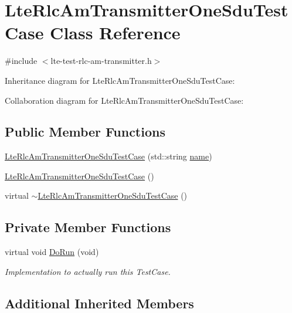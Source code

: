 \hypertarget{classLteRlcAmTransmitterOneSduTestCase}{}\section{Lte\+Rlc\+Am\+Transmitter\+One\+Sdu\+Test\+Case Class Reference}
\label{classLteRlcAmTransmitterOneSduTestCase}


{\ttfamily \#include $<$lte-\/test-\/rlc-\/am-\/transmitter.\+h$>$}



Inheritance diagram for Lte\+Rlc\+Am\+Transmitter\+One\+Sdu\+Test\+Case\+:


Collaboration diagram for Lte\+Rlc\+Am\+Transmitter\+One\+Sdu\+Test\+Case\+:
\subsection*{Public Member Functions}
\begin{DoxyCompactItemize}
\item 
\hyperlink{classLteRlcAmTransmitterOneSduTestCase_a5a7ff01bd5d69406feeff0df0a5ec461}{Lte\+Rlc\+Am\+Transmitter\+One\+Sdu\+Test\+Case} (std\+::string \hyperlink{generate__test__data__lte__spectrum__model_8m_ab74e6bf80237ddc4109968cedc58c151}{name})
\item 
\hyperlink{classLteRlcAmTransmitterOneSduTestCase_a667534b7b3e90d16e413663dfecf4d97}{Lte\+Rlc\+Am\+Transmitter\+One\+Sdu\+Test\+Case} ()
\item 
virtual \hyperlink{classLteRlcAmTransmitterOneSduTestCase_aacd1dfc48bf02744312df09ec14abaf5}{$\sim$\+Lte\+Rlc\+Am\+Transmitter\+One\+Sdu\+Test\+Case} ()
\end{DoxyCompactItemize}
\subsection*{Private Member Functions}
\begin{DoxyCompactItemize}
\item 
virtual void \hyperlink{classLteRlcAmTransmitterOneSduTestCase_ad0363c6b1e92694b98291cbca113501a}{Do\+Run} (void)
\begin{DoxyCompactList}\small\item\em Implementation to actually run this Test\+Case. \end{DoxyCompactList}\end{DoxyCompactItemize}
\subsection*{Additional Inherited Members}


